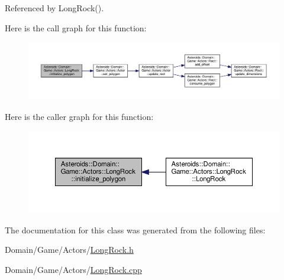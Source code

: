 Referenced by Long\+Rock().

Here is the call graph for this function\+:\nopagebreak
\begin{figure}[H]
\begin{center}
\leavevmode
\includegraphics[width=350pt]{classAsteroids_1_1Domain_1_1Game_1_1Actors_1_1LongRock_ac2469234e9ea81472af9e7297ff8a75a_cgraph}
\end{center}
\end{figure}
Here is the caller graph for this function\+:\nopagebreak
\begin{figure}[H]
\begin{center}
\leavevmode
\includegraphics[width=350pt]{classAsteroids_1_1Domain_1_1Game_1_1Actors_1_1LongRock_ac2469234e9ea81472af9e7297ff8a75a_icgraph}
\end{center}
\end{figure}


The documentation for this class was generated from the following files\+:\begin{DoxyCompactItemize}
\item 
Domain/\+Game/\+Actors/\hyperlink{LongRock_8h}{Long\+Rock.\+h}\item 
Domain/\+Game/\+Actors/\hyperlink{LongRock_8cpp}{Long\+Rock.\+cpp}\end{DoxyCompactItemize}

